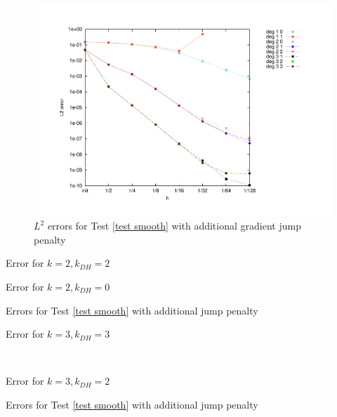 \begin{figure}[h!]
\centering
	\includegraphics[scale=0.45]{plots/MA1_Neilan_GradJump_l2.pdf}
	\caption{$L^2$ errors for Test \ref{test smooth} with additional gradient jump penalty}
	\label{fig: l2 errors test 1 jump}
\end{figure}
\begin{table}[H]
	\begin{subtable}[b]{0.4\textwidth}
		\centering
		\pgfplotstabletypeset[
		columns={iterations, l2error, h1error,N},
		every row 0 column 0/.style={set content=init},
		]\MAOneJumpdegTwoTwo
		\caption{Error for $k=2, k_{DH}=2$}
	\end{subtable}
	\hspace{0.7cm}
	\begin{subtable}[b]{0.4\textwidth}
		\centering
		\pgfplotstabletypeset[columns={iterations, l2error, h1error,N},
		every row 0 column 0/.style={set content=init},
		]\MAOneJumpdegTwoZero
		\caption{Error for $k=2, k_{DH}=0$}
	\end{subtable}
	\caption{Errors for Test \ref{test smooth} with additional jump penalty}
	\label{tab: l2 errors test 1 deg 2 jump}
\end{table}
\begin{table}[h]
	\begin{subtable}[b]{0.45\textwidth}
		\centering
		\pgfplotstabletypeset[
		columns={iterations, l2error, h1error,N},
		every row 0 column 0/.style={set content=init},
		]\MAOneJumpdegThreeThree
		\caption{Error for $k=3, k_{DH}=3$}
	\end{subtable}
	~
	\begin{subtable}[b]{0.45\textwidth}
		\centering
		\pgfplotstabletypeset[columns={iterations, l2error, h1error,N},
		every row 0 column 0/.style={set content=init},
		]\MAOneJumpdegThreeTwo
		\caption{Error for $k=3, k_{DH}=2$}
	\end{subtable}
	\caption{Errors for Test \ref{test smooth} with additional jump penalty}
	\label{tab: l2 errors test 1 deg 3 jump}
\end{table}

